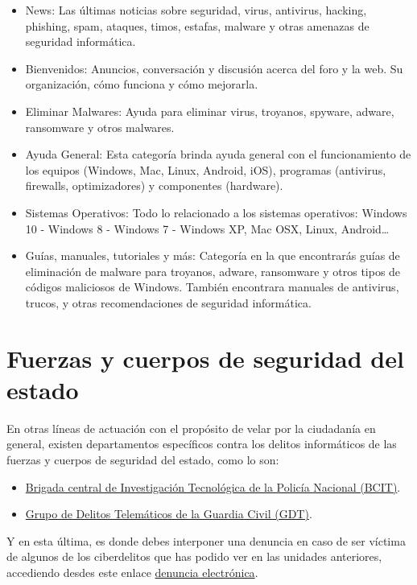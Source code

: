 \documentclass[
  spanish,
  a4paper,
  openany]{book}
\begin{document}
\begin{itemize}
\item
  News: Las últimas noticias sobre seguridad, virus, antivirus, hacking, phishing, spam, ataques, timos, estafas, malware y otras amenazas de seguridad informática.
\item
  Bienvenidos: Anuncios, conversación y discusión acerca del foro y la web. Su organización, cómo funciona y cómo mejorarla.
\item
  Eliminar Malwares: Ayuda para eliminar virus, troyanos, spyware, adware, ransomware y otros malwares.
\item
  Ayuda General: Esta categoría brinda ayuda general con el funcionamiento de los equipos (Windows, Mac, Linux, Android, iOS), programas (antivirus, firewalls, optimizadores) y componentes (hardware).
\item
  Sistemas Operativos: Todo lo relacionado a los sistemas operativos: Windows 10 - Windows 8 - Windows 7 - Windows XP, Mac OSX, Linux, Android\ldots{}
\item
  Guías, manuales, tutoriales y más: Categoría en la que encontrarás guías de eliminación de malware para troyanos, adware, ransomware y otros tipos de códigos maliciosos de Windows. También encontrara manuales de antivirus, trucos, y otras recomendaciones de seguridad informática.
\end{itemize}

\hypertarget{fuerzas-y-cuerpos-de-seguridad-del-estado}{%
\section{Fuerzas y cuerpos de seguridad del estado}\label{fuerzas-y-cuerpos-de-seguridad-del-estado}}

En otras líneas de actuación con el propósito de velar por la ciudadanía en general, existen departamentos específicos contra los delitos informáticos de las fuerzas y cuerpos de seguridad del estado, como lo son:

\begin{itemize}
\item
  \href{https://www.policia.es/_es/tupolicia_conocenos_estructura_dao_cgpoliciajudicial_bcit.php}{Brigada central de Investigación Tecnológica de la Policía Nacional (BCIT)}.
\item
  \href{https://www.gdt.guardiacivil.es/webgdt/home_alerta.php}{Grupo de Delitos Telemáticos de la Guardia Civil (GDT)}.
\end{itemize}

Y en esta última, es donde debes interponer una denuncia en caso de ser víctima de algunos de los ciberdelitos que has podido ver en las unidades anteriores, accediendo desdes este enlace \href{https://www.guardiacivil.es/es/servicios/denuncias/denuncia_electronica/index.html}{denuncia electrónica}.

  
\end{document}
